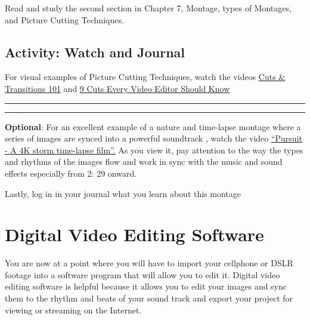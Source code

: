 \documentclass[
]{book}
\begin{document}
\begin{reflect}
Read and study the second section in Chapter 7, Montage, types of Montages, and Picture Cutting Techniques.
\end{reflect}

\hypertarget{activity-watch-and-journal}{%
\subsection*{Activity: Watch and Journal}\label{activity-watch-and-journal}}

\begin{reflect}
For visual examples of Picture Cutting Techniques, watch the videos \href{https://www.youtube.com/watch?v=OAH0MoAv2CI}{Cuts \& Transitions 101} and \href{https://www.youtube.com/watch?v=Wv3Hmf2Dxlo}{9 Cuts Every Video Editor Should Know}

\begin{center}\rule{0.5\linewidth}{0.5pt}\end{center}

\begin{center}\rule{0.5\linewidth}{0.5pt}\end{center}

\textbf{Optional}: For an excellent example of a nature and time-lapse montage where a series of images are synced into a powerful soundtrack , watch the video \href{https://www.youtube.com/watch?v=oagszCmJLpU}{``Pursuit - A 4K storm time-lapse film''.} As you view it, pay attention to the way the types and rhythms of the images flow and work in sync with the music and sound effects especially from 2: 29 onward.

Lastly, log in in your journal what you learn about this montage
\end{reflect}

\hypertarget{digital-video-editing-software}{%
\section{Digital Video Editing Software}\label{digital-video-editing-software}}

You are now at a point where you will have to import your cellphone or DSLR footage into a software program that will allow you to edit it. Digital video editing software is helpful because it allows you to edit your images and sync them to the rhythm and beats of your sound track and export your project for viewing or streaming on the Internet.
\end{document}
